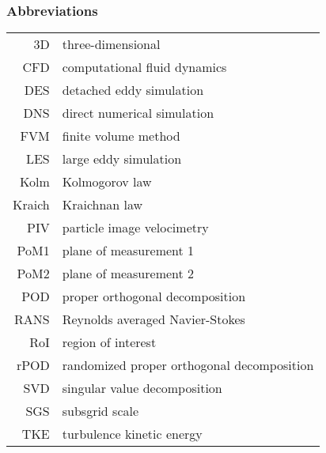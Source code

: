 \subsubsection*{Abbreviations}
\begin{tabular}{ rl}
    3D & three-dimensional \\
    CFD & computational fluid dynamics \\
    DES & detached eddy simulation \\
    DNS & direct numerical simulation \\
    FVM & finite volume method \\
    LES & large eddy simulation \\
    Kolm & Kolmogorov law \\
    Kraich & Kraichnan law \\
    PIV & particle image velocimetry \\
    PoM1 & plane of measurement 1 \\
    PoM2 & plane of measurement 2 \\
    POD & proper orthogonal decomposition \\
    RANS & Reynolds averaged Navier-Stokes \\
    RoI & {region of interest} \\
    rPOD & randomized proper orthogonal decomposition \\
    SVD & singular value decomposition \\
    SGS & {subsgrid scale} \\
    TKE & {turbulence kinetic energy} \\
\end{tabular}
    


